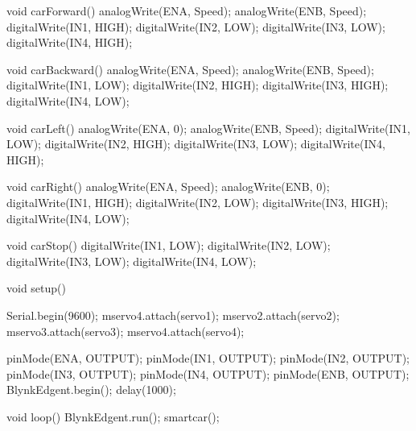 \begin{tcblisting}
void carForward() {
  analogWrite(ENA, Speed);
  analogWrite(ENB, Speed);
  digitalWrite(IN1, HIGH);
  digitalWrite(IN2, LOW);
  digitalWrite(IN3, LOW);
  digitalWrite(IN4, HIGH);
}

void carBackward() {
  analogWrite(ENA, Speed);
  analogWrite(ENB, Speed);
  digitalWrite(IN1, LOW);
  digitalWrite(IN2, HIGH);
  digitalWrite(IN3, HIGH);
  digitalWrite(IN4, LOW);
}

void carLeft() {
  analogWrite(ENA, 0);
  analogWrite(ENB, Speed);
  digitalWrite(IN1, LOW);
  digitalWrite(IN2, HIGH);
  digitalWrite(IN3, LOW);
  digitalWrite(IN4, HIGH);
}

void carRight() {
  analogWrite(ENA, Speed);
  analogWrite(ENB, 0);
  digitalWrite(IN1, HIGH);
  digitalWrite(IN2, LOW);
  digitalWrite(IN3, HIGH);
  digitalWrite(IN4, LOW);
}

void carStop() {
  digitalWrite(IN1, LOW);
  digitalWrite(IN2, LOW);
  digitalWrite(IN3, LOW);
  digitalWrite(IN4, LOW);
}

void setup() {
  Serial.begin(9600);
  mservo4.attach(servo1);
  mservo2.attach(servo2); 
  mservo3.attach(servo3); 
  mservo4.attach(servo4);

  pinMode(ENA, OUTPUT);
  pinMode(IN1, OUTPUT);
  pinMode(IN2, OUTPUT);
  pinMode(IN3, OUTPUT);
  pinMode(IN4, OUTPUT);
  pinMode(ENB, OUTPUT);
  BlynkEdgent.begin();
  delay(1000); 
}

void loop() {
  BlynkEdgent.run();
  smartcar();
}
\end{tcblisting}
